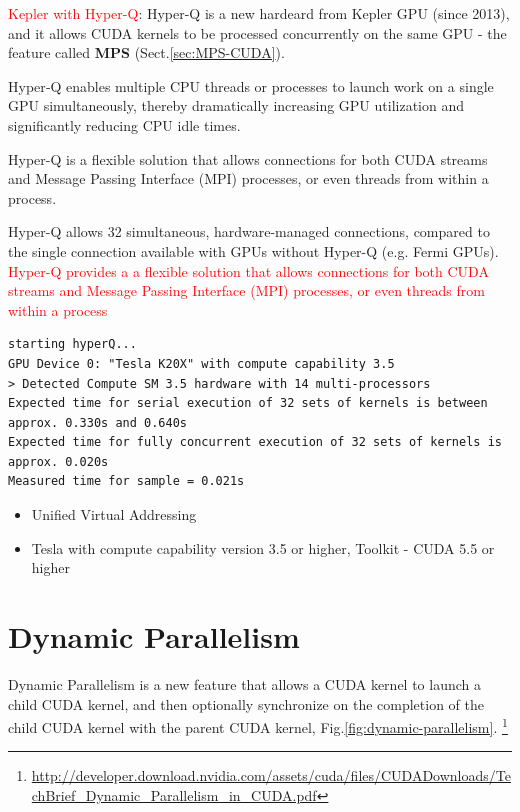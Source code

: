 \textcolor{red}{Kepler with Hyper-Q}: Hyper-Q is a new hardeard from Kepler GPU
(since 2013), and it allows CUDA kernels to be processed concurrently on the
same GPU  - the feature called {\bf MPS} (Sect.\ref{sec:MPS-CUDA}).

Hyper‐Q enables multiple CPU threads or processes to launch work on a single GPU
simultaneously, thereby dramatically increasing GPU utilization and
significantly reducing CPU idle times.

Hyper-Q is a flexible solution that allows connections for both CUDA streams and
Message Passing Interface (MPI) processes, or even threads from within a process.


Hyper-Q allows 32 simultaneous, hardware-managed connections, compared to the
single connection available with GPUs without Hyper-Q (e.g. Fermi GPUs).
\textcolor{red}{Hyper-Q provides a a flexible solution that allows connections
for both CUDA streams and Message Passing Interface (MPI) processes, or even
threads from within a process}

\begin{verbatim}
starting hyperQ...
GPU Device 0: "Tesla K20X" with compute capability 3.5
> Detected Compute SM 3.5 hardware with 14 multi-processors
Expected time for serial execution of 32 sets of kernels is between approx. 0.330s and 0.640s
Expected time for fully concurrent execution of 32 sets of kernels is approx. 0.020s
Measured time for sample = 0.021s
\end{verbatim}

\begin{itemize} 
  \item Unified Virtual Addressing 
  
  \item Tesla with compute capability version 3.5 or higher, Toolkit - CUDA 5.5 or higher

\end{itemize}

\section{Dynamic Parallelism}
\label{sec:Kepler_Dynamic-Parallelism}
\label{sec:dynamic-parallelism}

Dynamic Parallelism is a new feature that allows a CUDA kernel to launch a child
CUDA kernel, and then optionally synchronize on the completion of the child CUDA
kernel with the parent CUDA kernel, Fig.\ref{fig:dynamic-parallelism}.
\footnote{\url{http://developer.download.nvidia.com/assets/cuda/files/CUDADownloads/TechBrief_Dynamic_Parallelism_in_CUDA.pdf}}


